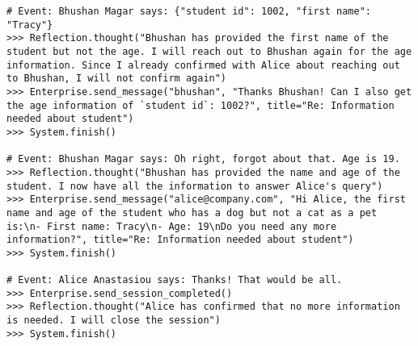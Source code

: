 \begin{lstlisting}[breaklines=true, caption={An annotated exemplar in the question answering domain, with received messages, tool calls, and observations.}, label={lst:exemplar}]
# Event: Bhushan Magar says: {"student id": 1002, "first name": "Tracy"}
>>> Reflection.thought("Bhushan has provided the first name of the student but not the age. I will reach out to Bhushan again for the age information. Since I already confirmed with Alice about reaching out to Bhushan, I will not confirm again")
>>> Enterprise.send_message("bhushan", "Thanks Bhushan! Can I also get the age information of `student id`: 1002?", title="Re: Information needed about student")
>>> System.finish()

# Event: Bhushan Magar says: Oh right, forgot about that. Age is 19.
>>> Reflection.thought("Bhushan has provided the name and age of the student. I now have all the information to answer Alice's query")
>>> Enterprise.send_message("alice@company.com", "Hi Alice, the first name and age of the student who has a dog but not a cat as a pet is:\n- First name: Tracy\n- Age: 19\nDo you need any more information?", title="Re: Information needed about student")
>>> System.finish()

# Event: Alice Anastasiou says: Thanks! That would be all.
>>> Enterprise.send_session_completed()
>>> Reflection.thought("Alice has confirmed that no more information is needed. I will close the session")
>>> System.finish()
\end{lstlisting} 



